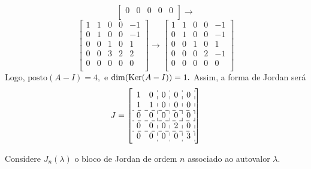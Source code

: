 \documentclass[11pt,a4paper]{article}
\begin{document}
{{\[\begin{bmatrix}
0 & 0 & 0& 0 & 0\\
\end{bmatrix}\rightarrow\]\[
\begin{bmatrix}
1 & 1 & 0& 0& -1\\
0 & 1 & 0& 0 & -1\\
0 & 0 & 1& 0 & 1\\
0 & 0 & 3& 2& 2\\
0 & 0 & 0& 0 & 0\\
\end{bmatrix}\rightarrow
\begin{bmatrix}
1 & 1 & 0& 0& -1\\
0 & 1 & 0& 0 & -1\\
0 & 0 & 1& 0 & 1\\
0 & 0 & 0& 2& -1\\
0 & 0 & 0& 0 & 0\\
\end{bmatrix}
\]
Logo, $\mbox{posto}(A-I) = 4,$ e $\dim(\operatorname{Ker}(A-I)) = 1.$ Assim, a forma de Jordan será
\[
J= \left[\begin{array}{cc:c:c:c:c}
1 & 0 & 0 & 0 & 0  \\
1 & 1 & 0 & 0 & 0  \\ \hdashline
0 & 0 & 0 & 0 & 0  \\ \hdashline
0 & 0 & 0 & 2 & 0  \\ \hdashline
0 & 0 & 0 & 0 & 3 \\
\end{array}\right]
\]
}
}
\begin{exercicio}
Considere $J_n(\lambda)$ o bloco de Jordan de ordem $n$ associado ao autovalor $\lambda.$
\end{exercicio}
\end{document}
